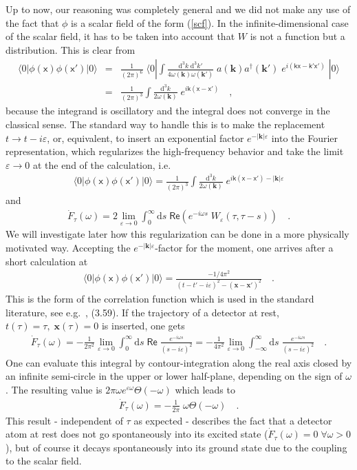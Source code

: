 \documentclass[a4paper,12pt]{article}
\renewcommand{\Re}{\mathsf{Re}}
\newcommand{\bra}[1]{\langle #1|}
\newcommand{\ket}[1]{|#1\rangle }
\newcommand{\eps}{\varepsilon}
\newcommand{\Fd}{\dot F_{\tau}(\omega)}
\newcommand{\vx}{\mathbf{x}}
\newcommand{\vk}{\mathbf{k}}
\newcommand{\vvx}{\mathsf x}
\newcommand{\vvk}{\mathsf k}
\newcommand{\lime}{\lim_{\eps\to0}}
\newcommand{\vac}{\ket{0}}
\newcommand{\cav}{\bra{0}}
\renewcommand{\d}{\mathrm{d}}
\begin{document}
Up to now, our reasoning was completely general and we did not make any use of the fact 
that $\phi$ is a scalar field of the form (\ref{scf}). 
In the infinite-dimensional case of the scalar field, it has to be taken into account 
that $W$ is not a function but a distribution. This is clear from 
\begin{eqnarray*}
\cav\phi(\vvx)\phi(\vvx')\vac&=&\frac{1}{(2\pi)^6}\;\cav
\int\frac{\d^3k\;\d^3k'}{4\omega(\vk) 
\omega(\vk')}\;a(\vk) a^\dag(\vk')\; e^{i(\vvk\vvx-\vvk'\vvx')}\;\vac\\
&=&\frac{1}{(2\pi)^3}\int\frac{\d^3k}{2\omega(\vk)}\;e^{i\vvk(\vvx-\vvx')}\quad,
\end{eqnarray*}
because the integrand is oscillatory and the integral does not converge in the 
classical sense. The standard way to handle this is to 
make the replacement $t\to t-i\eps$, or, equivalent, to insert an exponential factor
$e^{-|\vk|\eps}$ into the Fourier representation, which regularizes the 
high-frequency behavior and take the limit $\eps\to 0$ at the end of the calculation,
i.e.
\begin{eqnarray}
\label{eq:cfreg}
\cav\phi(\vvx)\phi(\vvx')\vac=
\frac{1}{(2\pi)^3}\int\frac{\d^3k}{2\omega(\vk)}\;e^{i\vvk(\vvx-\vvx')-|\vk|\eps}
\end{eqnarray}
and
\begin{eqnarray}
\label{eq:Fdreg}
\Fd=2\lime\int_0^\infty\d s\;\Re\left(e^{-i\omega s}\;W_\eps(\tau,\tau-s)\right)\quad.
\end{eqnarray}
We will investigate later how this regularization can be done 
in a more physically motivated way. Accepting the $e^{-|\vk|\eps}$-factor for the 
moment, one arrives after a short calculation at
\begin{eqnarray}
\label{eq:bdcf}
\cav\phi(\vvx)\phi(\vvx')\vac=\frac{-1/4\pi^2}{(t-t'-i\eps)^2-(\vx-\vx')^2}\quad.
\end{eqnarray}
This is the form of the correlation function which is used in the standard literature, 
see e.g.\ \cite{bd}, (3.59). If the trajectory of a detector at rest, 
$t(\tau)=\tau,\;\vx(\tau)=0$ is inserted, one gets 
\begin{eqnarray*}
\Fd=-\frac{1}{2\pi^2}\lime\int_0^\infty\d s\;\Re\;\frac{e^{-i\omega s}}{(s-i\eps)^2}=
-\frac{1}{4\pi^2}\lime\int_{-\infty}^\infty\d s\;\frac{e^{-i\omega s}}{(s-i\eps)^2}\quad.
\end{eqnarray*}
One can evaluate this integral by contour-integration along the real axis closed by an
infinite semi-circle in the upper or lower half-plane, depending on the sign of $\omega$.
The resulting value is $2\pi\omega e^{\eps\omega}\Theta(-\omega)$ which leads to
\begin{eqnarray*}
\Fd=-\frac{1}{2\pi}\;\omega\Theta(-\omega)\quad.
\end{eqnarray*}
This result - independent of $\tau$ as expected - describes the fact that a detector atom
at rest does not go spontaneously into its excited state ($\Fd=0\;\forall\omega>0$), but
of course it decays spontaneously into its ground state due to the coupling to the 
scalar field.
\end{document}

